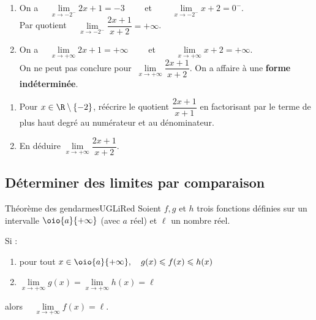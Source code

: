 \documentclass[a4paper,11pt,cours]{nsi} %
\begin{document}
\begin{exemple}[s]
	\begin{enumerate}[label=\textbullet]
		\item On a $\quad \lim\limits_{x\to -2^-} 2x+1 = -3\qquad$ et $\qquad \lim\limits_{x\to-2^-} x+2 =0^-$.\\[.5em]
		Par quotient $\quad \lim\limits_{x\to-2^-} \dfrac{2x+1}{x+2}=+\infty$.
		\item On a $\quad \lim\limits_{x\to +\infty} 2x+1 = +\infty\qquad$ et $\qquad \lim\limits_{x\to+\infty} x+2 =+\infty$.\\[.5em]
		On ne peut pas conclure pour $\ \lim\limits_{x\to+\infty} \dfrac{2x+1}{x+2}$. On a affaire à une \textbf{forme indéterminée}.\\[.5em]
	\end{enumerate}
\end{exemple}

\begin{exercice}[]
	\begin{enumerate}
		\item Pour $x\in\R\setminus\left\{-2\right\}$, réécrire le quotient $\dfrac{2x+1}{x+1}$ en factorisant par le terme de plus haut degré au numérateur et au dénominateur.
		\item En déduire $\lim\limits_{x\to+\infty} \dfrac{2x+1}{x+2}$.
	\end{enumerate}
	
\end{exercice}

\subsection*{Déterminer des limites par comparaison}

\begin{encadrecolore}{Théorème des gendarmes}{UGLiRed}
    Soient $f, g$ et $h$ trois fonctions définies sur un intervalle $\oio{a}{+\infty}$ (avec $a$ réel) et $\ell$ un nombre réel.\\[.5em]
	\begin{minipage}{1cm}
		Si :\\
		\vspace*{.9cm}
	\end{minipage}
	\begin{minipage}{10cm}
		\begin{enumerate}[label=\textbullet]
			\item pour tout $x\in\oio{a}{+\infty}, \quad g(x)\leqslant f(x)\leqslant h(x)$
			\item $\lim\limits_{x\to+\infty} g(x) = \lim\limits_{x\to+\infty} h(x)= \ell$\\
		\end{enumerate}
	\end{minipage}
	
	alors $\quad \lim\limits_{x\to+\infty} f(x)=\ell$.
\end{encadrecolore}
\end{document}
